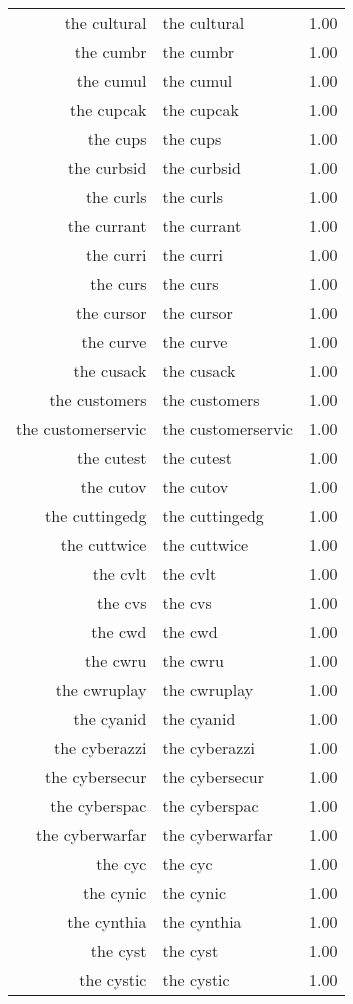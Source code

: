 \begin{table}[ht]
\begin{tabular}{rlr}
  the cultural & the cultural & 1.00 \\ 
  the cumbr & the cumbr & 1.00 \\ 
  the cumul & the cumul & 1.00 \\ 
  the cupcak & the cupcak & 1.00 \\ 
  the cups & the cups & 1.00 \\ 
  the curbsid & the curbsid & 1.00 \\ 
  the curls & the curls & 1.00 \\ 
  the currant & the currant & 1.00 \\ 
  the curri & the curri & 1.00 \\ 
  the curs & the curs & 1.00 \\ 
  the cursor & the cursor & 1.00 \\ 
  the curve & the curve & 1.00 \\ 
  the cusack & the cusack & 1.00 \\ 
  the customers & the customers & 1.00 \\ 
  the customerservic & the customerservic & 1.00 \\ 
  the cutest & the cutest & 1.00 \\ 
  the cutov & the cutov & 1.00 \\ 
  the cuttingedg & the cuttingedg & 1.00 \\ 
  the cuttwice & the cuttwice & 1.00 \\ 
  the cvlt & the cvlt & 1.00 \\ 
  the cvs & the cvs & 1.00 \\ 
  the cwd & the cwd & 1.00 \\ 
  the cwru & the cwru & 1.00 \\ 
  the cwruplay & the cwruplay & 1.00 \\ 
  the cyanid & the cyanid & 1.00 \\ 
  the cyberazzi & the cyberazzi & 1.00 \\ 
  the cybersecur & the cybersecur & 1.00 \\ 
  the cyberspac & the cyberspac & 1.00 \\ 
  the cyberwarfar & the cyberwarfar & 1.00 \\ 
  the cyc & the cyc & 1.00 \\ 
  the cynic & the cynic & 1.00 \\ 
  the cynthia & the cynthia & 1.00 \\ 
  the cyst & the cyst & 1.00 \\ 
  the cystic & the cystic & 1.00 \\ 

\end{tabular}
\end{table}
